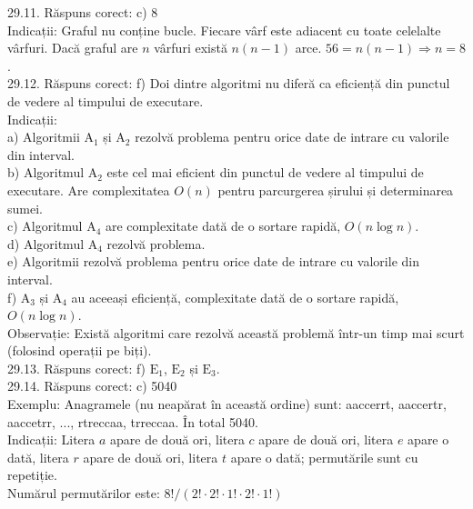 29.11. Răspuns corect: c) 8\\
Indicații: Graful nu conține bucle. Fiecare vârf este adiacent cu toate celelalte vârfuri. Dacă graful are $n$ vârfuri există $n(n-1)$ arce. $56=n(n-1) \Rightarrow n=8$.\\

29.12. Răspuns corect: f) Doi dintre algoritmi nu diferă ca eficiență din punctul de vedere al timpului de executare.\\
Indicații:\\ a) Algoritmii $\mathrm{A}_{1}$ și $\mathrm{A}_{2}$ rezolvă problema pentru orice date de intrare cu valorile din interval.\\ b) Algoritmul $\mathrm{A}_{2}$ este cel mai eficient din punctul de vedere al timpului de executare. Are complexitatea $O(n)$ pentru parcurgerea șirului și determinarea sumei.\\ c) Algoritmul $\mathrm{A}_{4}$ are complexitate dată de o sortare rapidă, $O(n \log n)$.\\ d) Algoritmul $\mathrm{A}_{4}$ rezolvă problema.\\ e) Algoritmii rezolvă problema pentru orice date de intrare cu valorile din interval.\\ f) $\mathrm{A}_{3}$ și $\mathrm{A}_{4}$ au aceeași eficiență, complexitate dată de o sortare rapidă, $O(n \log n)$.\\ Observație: Există algoritmi care rezolvă această problemă într-un timp mai scurt (folosind operații pe biți).\\

29.13. Răspuns corect: f) $\mathrm{E}_{1}$, $\mathrm{E}_{2}$ și $\mathrm{E}_{3}$.\\

29.14. Răspuns corect: c) 5040\\
Exemplu: Anagramele (nu neapărat în această ordine) sunt: aaccerrt, aaccertr, aaccetrr, ..., rtreccaa, trreccaa. În total 5040.\\ Indicații: Litera $a$ apare de două ori, litera $c$ apare de două ori, litera $e$ apare o dată, litera $r$ apare de două ori, litera $t$ apare o dată; permutările sunt cu repetiție.\\ Numărul permutărilor este: $8 !/(2! \cdot 2!\cdot 1!\cdot 2!\cdot 1!)$\\


